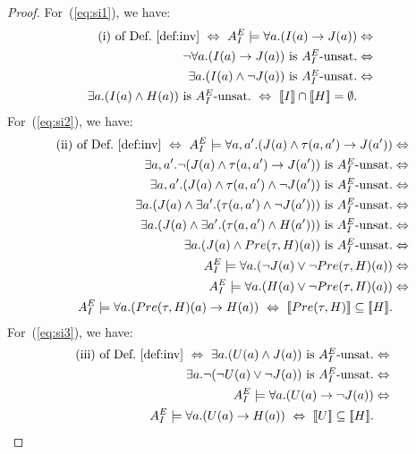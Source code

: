 \documentclass{LMCS}
\newcommand{\mywidehat}[1]{\ensuremath{\lbrack\!\lbrack #1 \rbrack\!\rbrack}}
\theoremstyle{plain}\newtheorem{assumption}[thm]{Assumption}
\theoremstyle{plain}\newtheorem{proposition}[thm]{Proposition}
\theoremstyle{plain}\newtheorem{property}[thm]{Property}
\theoremstyle{plain}\newtheorem{example}[thm]{Example}
\theoremstyle{plain}\newtheorem{claim}[thm]{Claim}
\theoremstyle{plain}\newtheorem{lemma}[thm]{Lemma}
\begin{document}
\begin{proof}
  For~(\ref{eq:si1}), we have:
  \begin{eqnarray*}
    \mbox{(i) of Def.~\ref{def:inv}} ~\Leftrightarrow~
    A_I^E \models \forall a.(I(a) \to J(a)) & \Leftrightarrow~\\
    \neg \forall a.(I(a) \to J(a)) \mbox{ is
      $A_I^E$-unsat.} & \Leftrightarrow~\\
      \exists a.(I(a) \wedge \neg J(a)) \mbox{ is
      $A_I^E$-unsat.} & \Leftrightarrow~\\
    \exists a.(I(a) \wedge H(a)) \mbox{ is
      $A_I^E$-unsat.} ~\Leftrightarrow~
    \mywidehat{I} \cap \mywidehat{H} = \emptyset . &
  \end{eqnarray*}
  For~(\ref{eq:si2}), we have:
  \begin{eqnarray*}
    \mbox{(ii) of Def.~\ref{def:inv}} ~\Leftrightarrow~
    A_I^E \models \forall a,a'.(J(a) \wedge \tau(a,a')\to J(a'))
    & \Leftrightarrow \\
    \exists a,a'.\neg (J(a) \wedge \tau(a,a')\to
    J(a')) \mbox{ is $A_I^E$-unsat.} & \Leftrightarrow\\
    \exists a,a'.(J(a) \wedge \tau(a,a')\wedge \neg
    J(a')) \mbox{ is $A_I^E$-unsat.} & \Leftrightarrow \\
    \exists a.(J(a) \wedge \exists
    a'.(\tau(a,a')\wedge \neg J(a')))  \mbox{ is $A_I^E$-unsat.}
    & \Leftrightarrow \\
    \exists a.(J(a) \wedge \exists
    a'.(\tau(a,a')\wedge H(a')))  \mbox{ is $A_I^E$-unsat.}
    & \Leftrightarrow \\
    \exists a.(J(a) \wedge Pre(\tau,H)(a)) \mbox{ is
      $A_I^E$-unsat.} & \Leftrightarrow \\
    A_I^E \models \forall a.(\neg J(a) \vee \neg
    Pre(\tau,H)(a))  & \Leftrightarrow\\
    A_I^E \models \forall a.(H(a) \vee \neg
    Pre(\tau,H)(a))  & \Leftrightarrow \\
    A_I^E \models \forall a.(Pre(\tau,H)(a)\to H(a))
    ~\Leftrightarrow~  \mywidehat{Pre(\tau,H)} \subseteq
    \mywidehat{H}. &
  \end{eqnarray*}
  For~(\ref{eq:si3}), we have:
  \begin{eqnarray*}
    \mbox{(iii) of Def.~\ref{def:inv}} ~\Leftrightarrow~
    \exists a.(U(a) \wedge J(a)) \mbox{ is $A_I^E$-unsat.}
    & \Leftrightarrow \\
    \exists a.\neg (\neg U(a) \vee \neg J(a)) \mbox{ is
      $A_I^E$-unsat.} & \Leftrightarrow\\
    A_I^E\models \forall a. ( U(a) \to \neg J(a))
    & \Leftrightarrow \\
    A_I^E\models \forall a. ( U(a) \to H(a)) ~\Leftrightarrow~
    \mywidehat{U} \subseteq \mywidehat{H} . &
  \end{eqnarray*}
\end{proof}
\end{document}
